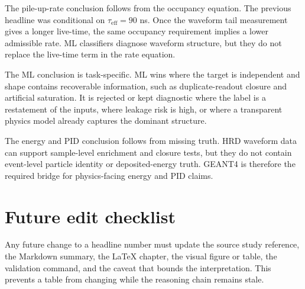 The pile-up-rate conclusion follows from the occupancy equation.  The previous
headline was conditional on \(\tau_{\mathrm{eff}}=90\) ns.  Once the waveform
tail measurement gives a longer live-time, the same occupancy requirement
implies a lower admissible rate.  ML classifiers diagnose waveform structure,
but they do not replace the live-time term in the rate equation.

The ML conclusion is task-specific.  ML wins where the target is independent and
shape contains recoverable information, such as duplicate-readout closure and
artificial saturation.  It is rejected or kept diagnostic where the label is a
restatement of the inputs, where leakage risk is high, or where a transparent
physics model already captures the dominant structure.

The energy and PID conclusion follows from missing truth.  HRD waveform data can
support sample-level enrichment and closure tests, but they do not contain
event-level particle identity or deposited-energy truth.  GEANT4 is therefore
the required bridge for physics-facing energy and PID claims.

\section{Future edit checklist}

Any future change to a headline number must update the source study reference,
the Markdown summary, the LaTeX chapter, the visual figure or table, the
validation command, and the caveat that bounds the interpretation.  This prevents
a table from changing while the reasoning chain remains stale.
